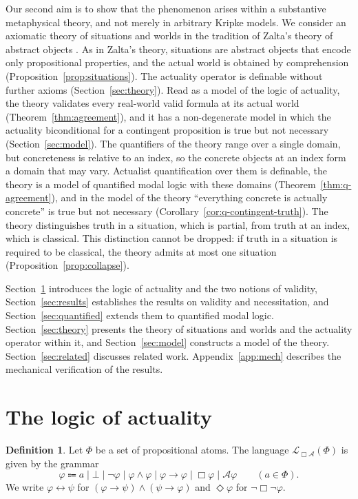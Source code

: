 \documentclass[11pt]{amsart}
\theoremstyle{plain}
\theoremstyle{definition}
\newtheorem{definition}[theorem]{Definition}
\theoremstyle{remark}
\newcommand{\Act}{\mathcal{A}}
\newcommand{\Lang}{\mathcal{L}_{\Box\Act}}
\begin{document}
Our second aim is to show that the phenomenon arises within a
substantive metaphysical theory, and not merely in arbitrary Kripke
models. We consider an axiomatic theory of situations and worlds in the
tradition of Zalta's theory of abstract objects
\cite{zalta1983,zalta1993}. As in Zalta's theory, situations are
abstract objects that encode only propositional properties, and the
actual world is obtained by comprehension
(Proposition~\ref{prop:situations}). The actuality operator is
definable without further axioms (Section~\ref{sec:theory}). Read as a
model of the logic of actuality, the theory validates every real-world
valid formula at its actual world (Theorem~\ref{thm:agreement}), and it
has a non-degenerate model in which the actuality biconditional for a
contingent proposition is true but not necessary
(Section~\ref{sec:model}). The quantifiers of the theory range over a
single domain, but concreteness is relative to an index, so the
concrete objects at an index form a domain that may vary. Actualist
quantification over them is definable, the theory is a model of
quantified modal logic with these domains
(Theorem~\ref{thm:q-agreement}), and in the model of the theory
``everything concrete is actually concrete'' is true but not necessary
(Corollary~\ref{cor:q-contingent-truth}). The theory distinguishes truth in a
situation, which is partial, from truth at an index, which is
classical. This distinction cannot be dropped: if truth in a situation
is required to be classical, the theory admits at most one situation
(Proposition~\ref{prop:collapse}).

Section~\ref{sec:logic} introduces the logic of actuality and the two
notions of validity, Section~\ref{sec:results} establishes the
results on validity and necessitation, and Section~\ref{sec:quantified}
extends them to quantified modal logic. Section~\ref{sec:theory}
presents the theory of situations and worlds and the actuality operator
within it, and Section~\ref{sec:model} constructs a model of the
theory. Section~\ref{sec:related} discusses related work.
Appendix~\ref{app:mech} describes the mechanical verification of the
results.

\section{The logic of actuality}
\label{sec:logic}

\begin{definition}
Let $\Phi$ be a set of propositional atoms. The language $\Lang(\Phi)$
is given by the grammar
\[
  \varphi \Coloneqq a \mid \bot \mid \neg\varphi \mid
  \varphi \wedge \varphi \mid \varphi \to \varphi \mid
  \Box\varphi \mid \Act\varphi
  \qquad (a \in \Phi).
\]
We write $\varphi \leftrightarrow \psi$ for
$(\varphi \to \psi) \wedge (\psi \to \varphi)$ and $\Diamond\varphi$
for $\neg\Box\neg\varphi$.
\end{definition}
\end{document}
